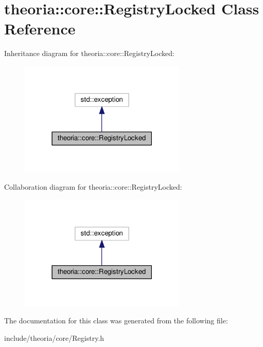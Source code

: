 \hypertarget{classtheoria_1_1core_1_1RegistryLocked}{}\section{theoria\+:\+:core\+:\+:Registry\+Locked Class Reference}
\label{classtheoria_1_1core_1_1RegistryLocked}


Inheritance diagram for theoria\+:\+:core\+:\+:Registry\+Locked\+:\nopagebreak
\begin{figure}[H]
\begin{center}
\leavevmode
\includegraphics[width=225pt]{classtheoria_1_1core_1_1RegistryLocked__inherit__graph}
\end{center}
\end{figure}


Collaboration diagram for theoria\+:\+:core\+:\+:Registry\+Locked\+:\nopagebreak
\begin{figure}[H]
\begin{center}
\leavevmode
\includegraphics[width=225pt]{classtheoria_1_1core_1_1RegistryLocked__coll__graph}
\end{center}
\end{figure}


The documentation for this class was generated from the following file\+:\begin{DoxyCompactItemize}
\item 
include/theoria/core/Registry.\+h\end{DoxyCompactItemize}
